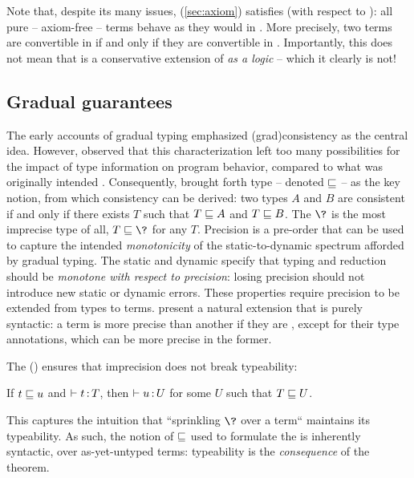 Note that, despite its many issues,  (\cref{sec:axiom}) satisfies
 (with respect to ):
all pure – \ie axiom-free –  terms behave as they would in .
More precisely, two  terms are convertible in 
if and only if they are convertible in .
Importantly, this does not mean that  is a conservative extension of
 \emph{as a logic} – which it clearly is not!

\subsection{Gradual guarantees}
The early accounts of gradual typing emphasized \kl(grad){consistency} as the central idea.
However,  observed that this characterization left too many
possibilities for the impact of type information on program behavior,
compared to what was originally intended .
%
Consequently, \textcite{Siek2015} brought forth type  – denoted $\sqsubseteq$ –
as the key notion, from which consistency can be derived: two types $A$ and $B$
are consistent if and only if there exists $T$ such that $T \sqsubseteq A$ and $T \sqsubseteq B$.
The  $\?$ is the most imprecise type of all,
\ie $T \pre \?$ for any $T$.
%
Precision is a pre-order that can be used to capture the intended \emph{monotonicity} of
the static-to-dynamic spectrum afforded by gradual typing.
The static and dynamic  specify that typing
and reduction should be \emph{monotone with respect to precision}:
losing precision should not introduce new static or dynamic errors.
%
These properties require precision to be extended from types to terms.
\textcite{Siek2015} present a natural extension that is purely syntactic:
a term is more precise than another if they are , except
for their type annotations, which can be more precise in the former.

\AP The  ()
ensures that imprecision does not break typeability:
\begin{property}
If $t \sqsubseteq u$ and $\vdash t \operatorname{:} T$, then $\vdash u \operatorname{:} U$
for some $U$ such that $T \sqsubseteq U$.
\end{property}
%
This  captures the intuition that “sprinkling $\?$ over a term“
maintains its typeability. As such, the notion of  $\sqsubseteq$ used to
formulate the  is inherently syntactic,
over as-yet-untyped terms: typeability is the \emph{consequence} of the  theorem.

